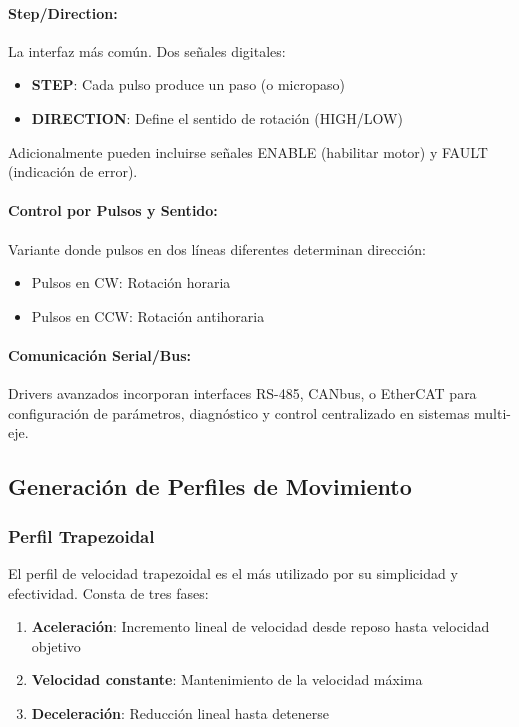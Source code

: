 \paragraph{Step/Direction:}

La interfaz más común. Dos señales digitales:
\begin{itemize}
    \item \textbf{STEP}: Cada pulso produce un paso (o micropaso)
    \item \textbf{DIRECTION}: Define el sentido de rotación (HIGH/LOW)
\end{itemize}

Adicionalmente pueden incluirse señales ENABLE (habilitar motor) y FAULT (indicación de error).

\paragraph{Control por Pulsos y Sentido:}

Variante donde pulsos en dos líneas diferentes determinan dirección:
\begin{itemize}
    \item Pulsos en CW: Rotación horaria
    \item Pulsos en CCW: Rotación antihoraria
\end{itemize}

\paragraph{Comunicación Serial/Bus:}

Drivers avanzados incorporan interfaces RS-485, CANbus, o EtherCAT para configuración de parámetros, diagnóstico y control centralizado en sistemas multi-eje.

\subsection{Generación de Perfiles de Movimiento}

\subsubsection{Perfil Trapezoidal}

El perfil de velocidad trapezoidal es el más utilizado por su simplicidad y efectividad. Consta de tres fases:

\begin{enumerate}
    \item \textbf{Aceleración}: Incremento lineal de velocidad desde reposo hasta velocidad objetivo
    \item \textbf{Velocidad constante}: Mantenimiento de la velocidad máxima
    \item \textbf{Deceleración}: Reducción lineal hasta detenerse
\end{enumerate}

